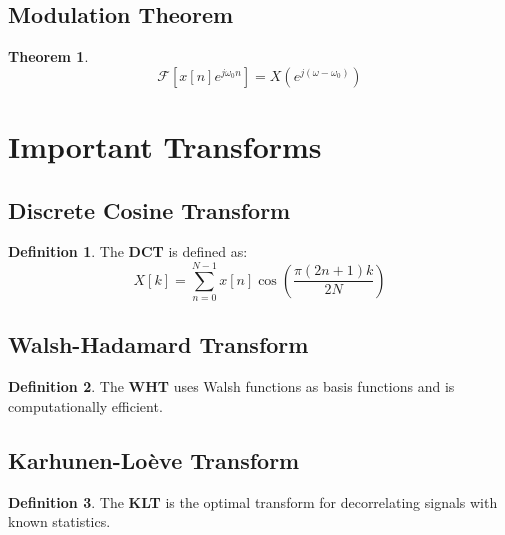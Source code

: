 \documentclass[11pt]{article}
\theoremstyle{definition}
\newtheorem{definition}{Definition}[section]
\newtheorem{theorem}{Theorem}[section]
\begin{document}
\subsection{Modulation Theorem}
\begin{theorem}
$$\mathcal{F}[x[n] e^{j\omega_0 n}] = X(e^{j(\omega - \omega_0)})$$
\end{theorem}

\section{Important Transforms}

\subsection{Discrete Cosine Transform}
\begin{definition}
The \textbf{DCT} is defined as:
$$X[k] = \sum_{n=0}^{N-1} x[n] \cos\left(\frac{\pi(2n+1)k}{2N}\right)$$
\end{definition}

\subsection{Walsh-Hadamard Transform}
\begin{definition}
The \textbf{WHT} uses Walsh functions as basis functions and is computationally efficient.
\end{definition}

\subsection{Karhunen-Loève Transform}
\begin{definition}
The \textbf{KLT} is the optimal transform for decorrelating signals with known statistics.
\end{definition}
\end{document}
